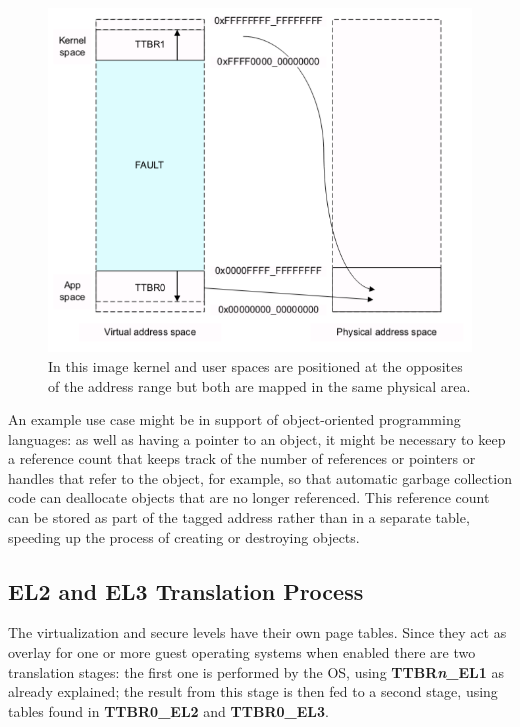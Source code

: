 \documentclass[12pt,a4paper,openright,twoside]{report}
\begin{document}
 \begin{figure}[h]
 \includegraphics[scale=0.6]{images/tesi11.png} 
 \caption[Kernel memory virtualization]{In this image kernel and user spaces 
 are positioned at the opposites of the address range but both are mapped in 
 the same physical area.}\label{fig:exceptions}
 \end{figure}


 An example use case might be in support of object-oriented programming languages:
 as well as having a pointer to an object, it might be necessary to keep a 
reference count that keeps track of the number of references or pointers or handles
 that refer to the object, for example, so that automatic garbage collection 
 code can deallocate objects that are no longer referenced. This reference 
 count can be stored as part of the tagged address rather than in a separate table, 
speeding up the process of creating or destroying objects.

\subsection{EL2 and EL3 Translation Process}
The virtualization and secure levels have their own page tables. Since they act
as overlay for one or more guest operating systems when enabled there are two translation
stages: the first one is performed by the OS, using \textbf{TTBR\textit{n}\_EL1}
as already explained; the result from this stage is then fed to a second stage,
using tables found in \textbf{TTBR0\_EL2} and \textbf{TTBR0\_EL3}.
\end{document}
